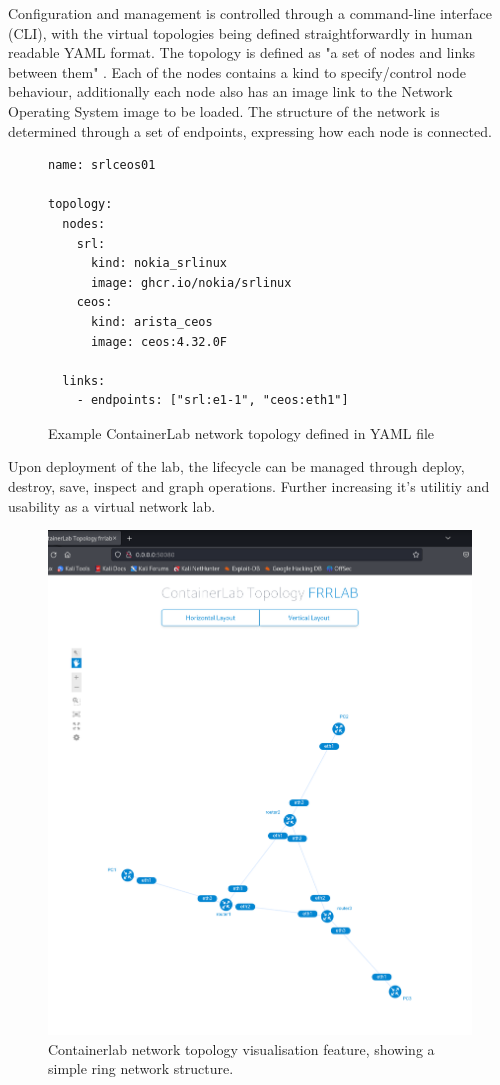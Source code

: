 Configuration and management is controlled through a command-line interface (CLI), with the virtual topologies being defined straightforwardly in human readable YAML format. The topology is defined as "a set of nodes and links between them" \cite{containerlab}. Each of the nodes contains a kind to specify/control node behaviour, additionally each node also has an image link to the Network Operating System image to be loaded. The structure of the network is determined through a set of endpoints, expressing how each node is connected.

\begin{figure}
    \centering
    \begin{lstlisting}
name: srlceos01

topology:
  nodes:
    srl:
      kind: nokia_srlinux
      image: ghcr.io/nokia/srlinux
    ceos:
      kind: arista_ceos
      image: ceos:4.32.0F

  links:
    - endpoints: ["srl:e1-1", "ceos:eth1"]
\end{lstlisting}
    \caption{Example ContainerLab network topology defined in YAML file}
    \label{fig:topology_yml}
\end{figure}

Upon deployment of the lab, the lifecycle can be managed through deploy, destroy, save, inspect and graph operations. Further increasing it's utilitiy and usability as a virtual network lab.

\begin{figure}
    \centering
    \includegraphics[width=0.5\linewidth]{images/ring_containerlab.png}
    \caption{Containerlab network topology visualisation feature, showing a simple ring network structure.}
    \label{fig:ring_container}
\end{figure}

